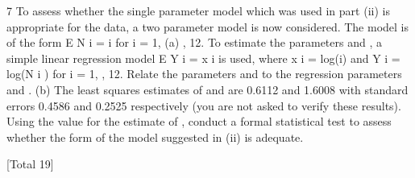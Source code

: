 \documentclass[a4paper,12pt]{article}
\begin{document}
7
To assess whether the single parameter model which was used in part (ii) is appropriate for the data, a two parameter model is now considered. The model
is of the form
E N i = i
for i = 1,
(a)
, 12.
To estimate the parameters and , a simple linear regression model
E Y i =
x i
is used, where x i = log(i) and Y i = log(N i ) for i = 1, , 12. Relate the
parameters and to the regression parameters and .
(b)
The least squares estimates of and are 0.6112 and 1.6008 with standard errors 0.4586 and 0.2525 respectively (you are not asked to
verify these results). Using the value for the estimate of , conduct a formal statistical test to assess whether the form of the model suggested in (ii) is adequate.

[Total 19]
\end{document}
